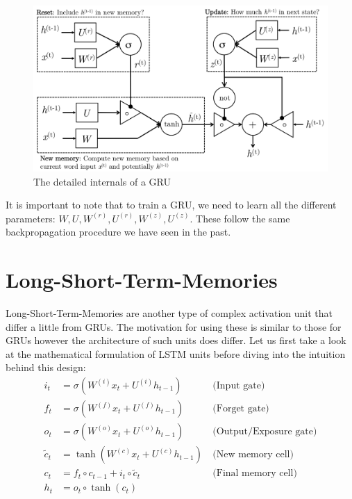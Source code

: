 \documentclass{tufte-handout}
\begin{document}
\begin{figure}%
  \includegraphics[width = 15cm]{GRU}
  \caption{The detailed internals of a GRU}
  \label{fig:GRU}
\end{figure}

It is important to note that to train a GRU, we need to learn all the different parameters: $W, U, W^{(r)}, U^{(r)}, W^{(z)}, U^{(z)}$. These follow the same backpropagation procedure we have seen in the past.

\section{Long-Short-Term-Memories}\label{sec:lstm}

Long-Short-Term-Memories are another type of complex activation unit that differ a little from GRUs. The motivation for using these is similar to those for GRUs however the architecture of such units does differ. Let us first take a look at the mathematical formulation of LSTM units before diving into the intuition behind this design:
\begin{align*}
i_{t} &= \sigma(W^{(i)}x_{t} + U^{(i)}h_{t-1})&~\text{(Input gate)}\\
f_{t} &= \sigma(W^{(f)}x_{t} + U^{(f)}h_{t-1})&~\text{(Forget gate)}\\
o_{t} &= \sigma(W^{(o)}x_{t} + U^{(o)}h_{t-1})&~\text{(Output/Exposure gate)}\\
\tilde{c}_{t} &= \operatorname{tanh}(W^{(c)}x_{t} + U^{(c)}h_{t-1})&~\text{(New memory cell)}\\
c_{t} &= f_{t} \circ c_{t-1} + i_{t} \circ \tilde{c}_{t}&~\text{(Final memory cell)}\\
h_{t} &= o_{t} \circ \operatorname{tanh}(c_{t}) 
\end{align*}
\end{document}
